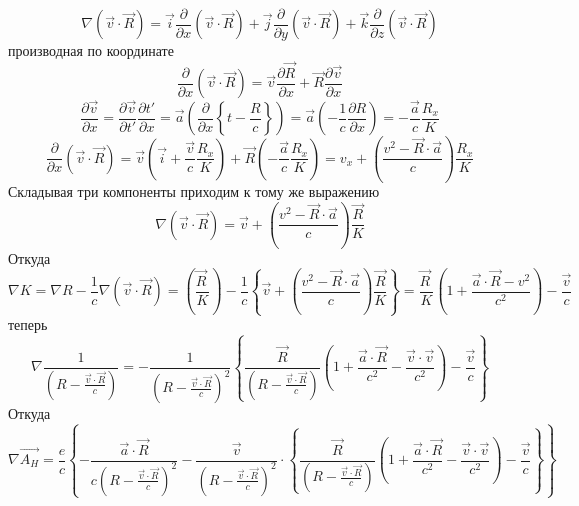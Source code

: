 \documentclass[11pt]{article}
\begin{document}
\[\nabla \left( \overrightarrow{v}\cdot \overrightarrow{R} \right)=\overrightarrow{i}\frac{\partial }{\partial x}\left( \overrightarrow{v}\cdot \overrightarrow{R} \right)+\overrightarrow{j}\frac{\partial }{\partial y}\left( \overrightarrow{v}\cdot \overrightarrow{R} \right)+\overrightarrow{k}\frac{\partial }{\partial z}\left( \overrightarrow{v}\cdot \overrightarrow{R} \right)\]
производная по координате
\[\frac{\partial }{\partial x}\left( \overrightarrow{v}\cdot \overrightarrow{R} \right)=\overrightarrow{v}\frac{\partial \overrightarrow{R}}{\partial x}+\overrightarrow{R}\frac{\partial \overrightarrow{v}}{\partial x}\]
\[\frac{\partial \overrightarrow{v}}{\partial x}=\frac{\partial \overrightarrow{v}}{\partial t'}\frac{\partial t'}{\partial x}=\overrightarrow{a}\left( \frac{\partial }{\partial x}\left\{ t-\frac{R}{c} \right\} \right)=\overrightarrow{a}\left( -\frac{1}{c}\frac{\partial R}{\partial x} \right)=-\frac{\overrightarrow{a}}{c}\frac{{{R}_{x}}}{K}\]
\[\frac{\partial }{\partial x}\left( \overrightarrow{v}\cdot \overrightarrow{R} \right)=\overrightarrow{v}\left( \overrightarrow{i}+\frac{\overrightarrow{v}}{c}\frac{{{R}_{x}}}{K} \right)+\overrightarrow{R}\left( -\frac{\overrightarrow{a}}{c}\frac{{{R}_{x}}}{K} \right)={{v}_{x}}+\left( \frac{{{v}^{2}}-\overrightarrow{R}\cdot \overrightarrow{a}}{c} \right)\frac{{{R}_{x}}}{K}\]
Складывая три компоненты приходим к тому же выражению
\[\nabla \left( \overrightarrow{v}\cdot \overrightarrow{R} \right)=\overrightarrow{v}+\left( \frac{{{v}^{2}}-\overrightarrow{R}\cdot \overrightarrow{a}}{c} \right)\frac{\overrightarrow{R}}{K}\]
Откуда
\[\nabla K=\nabla R-\frac{1}{c}\nabla \left( \overrightarrow{v}\cdot \overrightarrow{R} \right)=\left( \frac{\overrightarrow{R}\ }{K} \right)-\frac{1}{c}\left\{ \overrightarrow{v}+\left( \frac{{{v}^{2}}-\overrightarrow{R}\cdot \overrightarrow{a}}{c} \right)\frac{\overrightarrow{R}}{K} \right\}=\frac{\overrightarrow{R}\ }{K}\left( 1+\frac{\overrightarrow{a}\cdot \overrightarrow{R}-{{v}^{2}}}{{{c}^{2}}} \right)-\frac{\overrightarrow{v}}{c}\]
теперь
\[\nabla \frac{1}{\left( R-\frac{\overrightarrow{v}\cdot \overrightarrow{R}}{c} \right)}=-\frac{1}{{{\left( R-\frac{\overrightarrow{v}\cdot \overrightarrow{R}}{c} \right)}^{2}}}\left\{ \frac{\overrightarrow{R}}{\left( R-\frac{\overrightarrow{v}\cdot \overrightarrow{R}}{c} \right)}\left( 1+\frac{\overrightarrow{a}\cdot \overrightarrow{R}}{{{c}^{2}}}-\frac{\overrightarrow{v}\cdot \overrightarrow{v}}{{{c}^{2}}} \right)-\frac{\overrightarrow{v}}{c} \right\}\]
Откуда
\[\nabla \overrightarrow{{{A}_{H}}}=\frac{e}{c}\left\{ -\frac{\overrightarrow{a}\cdot \overrightarrow{R}}{c{{\left( R-\frac{\overrightarrow{v}\cdot \overrightarrow{R}}{c} \right)}^{2}}}-\frac{\overrightarrow{v}}{{{\left( R-\frac{\overrightarrow{v}\cdot \overrightarrow{R}}{c} \right)}^{2}}}\cdot \left\{ \frac{\overrightarrow{R}}{\left( R-\frac{\overrightarrow{v}\cdot \overrightarrow{R}}{c} \right)}\left( 1+\frac{\overrightarrow{a}\cdot \overrightarrow{R}}{{{c}^{2}}}-\frac{\overrightarrow{v}\cdot \overrightarrow{v}}{{{c}^{2}}} \right)-\frac{\overrightarrow{v}}{c} \right\} \right\}\]
\end{document}
